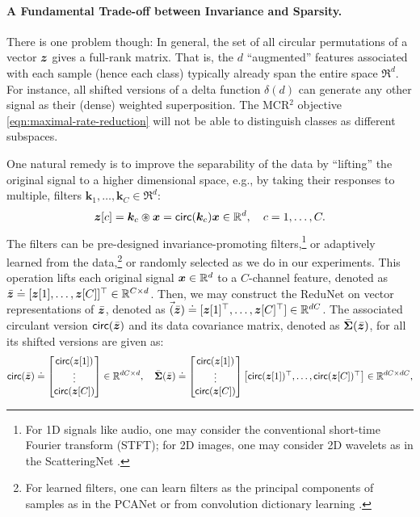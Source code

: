 \documentclass[../../book-main.tex]{subfiles}
\begin{document}
\paragraph{A Fundamental Trade-off between Invariance and Sparsity.} 
There is one problem though: In general, the set of all circular permutations of a vector $\bm{z}$ gives a full-rank matrix. That is, the $d$ ``augmented'' features associated with each sample (hence each class) typically already span the entire space $\Re^d$. For instance, all shifted versions of a delta function $\delta(d)$ can generate any other signal as their (dense) weighted superposition. The MCR$^2$ objective \eqref{eqn:maximal-rate-reduction} will not be able to distinguish classes as different subspaces.

One natural remedy is to improve the separability of the data by ``lifting'' the original signal to a higher dimensional space, e.g., by taking their responses to multiple, filters $\bm k_1, \ldots, \bm k_C \in \Re^d$: 
\begin{equation}
\bm z[c] = \bm k_c \circledast \bm x  =  \mathsf{circ}(\bm k_c) \bm x \in \mathbb{R}^d, \quad c = 1, \ldots, C.
\label{eqn:lift-1d}
\end{equation} 
The filters can be pre-designed invariance-promoting filters,\footnote{For 1D signals like audio, one may consider the conventional short-time Fourier transform (STFT); for 2D images, one may consider 2D wavelets as in the ScatteringNet \cite{scattering-net}.} or adaptively learned from the data,\footnote{For learned filters, one can learn filters as the principal components of samples as in the PCANet \cite{chan2015pcanet} or from convolution dictionary learning \cite{li2019multichannel,qu2019nonconvex}.} or randomly selected as we do in our experiments. This operation lifts each original signal $\bm{x} \in \mathbb{R}^d$ to a $C$-channel feature, denoted as $\bar{\bm{z}}  \doteq [\bm{z}[1], \ldots, \bm{z}[C]]^\top \in \mathbb{R}^{C\times d}$. 
Then, we may construct the ReduNet on vector representations of $\bar{\bm{z}}$, denoted as
$\vec(\bar{\bm{z}}) \doteq [\bm{z}[1]^\top, \ldots, \bm{z}[C]^\top] \in \mathbb{R}^{dC}$. 
The associated circulant version $ \mathsf{circ}(\bar{\bm{z}})$ and its data covariance matrix, denoted as $\bar{\bm \Sigma}(\bar{\bm{z}})$, for all its shifted versions are given as:
\begin{equation}
\begin{aligned}
 \mathsf{circ}(\bar{\bm{z}}) \doteq \left[\begin{matrix}
    \mathsf{circ}(\bm{z}[1])  \\ \vdots \\ \mathsf{circ}(\bm{z}[C]) \end{matrix} \right] \in \mathbb{R}^{dC\times d}, 
    \quad  \bar{\bm \Sigma}(\bar{\bm{z}}) \doteq 
    \left[\begin{matrix}
    \mathsf{circ}(\bm{z}[1]) \\ \vdots \\ \mathsf{circ}(\bm{z}[C]) \end{matrix} \right]
    \left[\begin{matrix}\mathsf{circ}(\bm{z}[1])^\top,\ldots, \mathsf{circ}(\bm{z}[C])^\top\end{matrix} \right] \in \mathbb{R}^{dC\times dC},
    \label{eqn:W-multichannel}
\end{aligned}
\end{equation}
\end{document}
